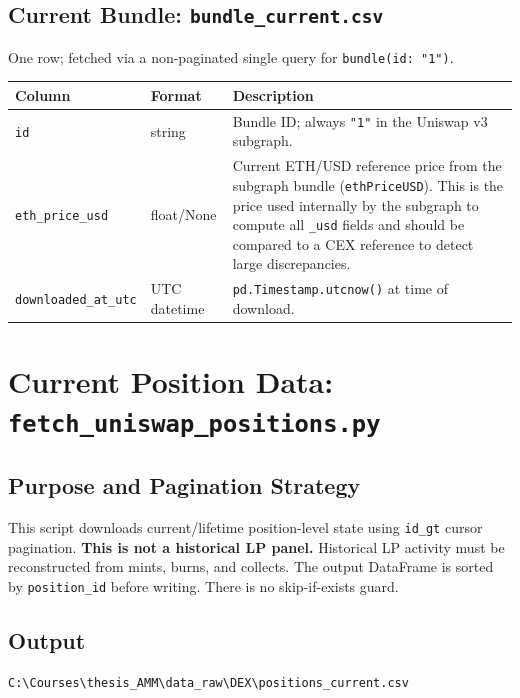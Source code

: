 \documentclass[11pt,a4paper]{article}
\begin{document}
\subsection{Current Bundle: \texttt{bundle\_current.csv}}

One row; fetched via a non-paginated single query for \texttt{bundle(id: "1")}.

\begin{xltabular}{\linewidth}{L{4.2cm}L{3.0cm}Y}
\toprule
\textbf{Column} & \textbf{Format} & \textbf{Description} \\
\midrule
\texttt{id} & string & Bundle ID; always \texttt{"1"} in the Uniswap v3
  subgraph. \\
\texttt{eth\_price\_usd} & float/None & Current ETH/USD reference price
  from the subgraph bundle (\texttt{ethPriceUSD}). This is the price used
  internally by the subgraph to compute all \texttt{\_usd} fields and should
  be compared to a CEX reference to detect large discrepancies. \\
\texttt{downloaded\_at\_utc} & UTC datetime & \texttt{pd.Timestamp.utcnow()}
  at time of download. \\
\bottomrule
\end{xltabular}

\section{Current Position Data: \texttt{fetch\_uniswap\_positions.py}}
\label{sec:positions}

\subsection{Purpose and Pagination Strategy}

This script downloads current/lifetime position-level state using
\texttt{id\_gt} cursor pagination. \textbf{This is not a historical LP
panel.} Historical LP activity must be reconstructed from mints, burns, and
collects. The output DataFrame is sorted by \texttt{position\_id} before
writing. There is no skip-if-exists guard.

\subsection{Output}

\begin{lstlisting}
C:\Courses\thesis_AMM\data_raw\DEX\positions_current.csv
\end{lstlisting}
\end{document}

